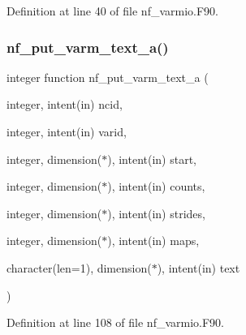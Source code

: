 Definition at line 40 of file nf\+\_\+varmio.\+F90.

\mbox{\label{nf__varmio_8F90_a2bc071356aa1e670286f67fc79e5d3bb}} 
\subsubsection{\texorpdfstring{nf\+\_\+put\+\_\+varm\+\_\+text\+\_\+a()}{nf\_put\_varm\_text\_a()}}
{\footnotesize\ttfamily integer function nf\+\_\+put\+\_\+varm\+\_\+text\+\_\+a (\begin{DoxyParamCaption}\item[{integer, intent(in)}]{ncid,  }\item[{integer, intent(in)}]{varid,  }\item[{integer, dimension($\ast$), intent(in)}]{start,  }\item[{integer, dimension($\ast$), intent(in)}]{counts,  }\item[{integer, dimension($\ast$), intent(in)}]{strides,  }\item[{integer, dimension($\ast$), intent(in)}]{maps,  }\item[{character(len=1), dimension($\ast$), intent(in)}]{text }\end{DoxyParamCaption})}



Definition at line 108 of file nf\+\_\+varmio.\+F90.

